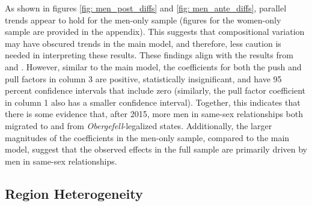 \documentclass[12pt,letterpaper]{article}
\begin{document}
As shown in figures \ref{fig: men_post_diffs} and \ref{fig: men_ante_diffs}, parallel trends appear to hold for the men-only sample (figures for the women-only sample are provided in the appendix). This suggests that compositional variation may have obscured trends in the main model, and therefore, less caution is needed in interpreting these results. These findings align with the results from \citet{1} and \citet{12}. However, similar to the main model, the coefficients for both the push and pull factors in column 3 are positive, statistically insignificant, and have 95 percent confidence intervals that include zero (similarly, the pull factor coefficient in column 1 also has a smaller confidence interval). Together, this indicates that there is some evidence that, after 2015, more men in same-sex relationships both migrated to and from \textit{Obergefell}-legalized states. Additionally, the larger magnitudes of the coefficients in the men-only sample, compared to the main model, suggest that the observed effects in the full sample are primarily driven by men in same-sex relationships.

\FloatBarrier
\subsection{Region Heterogeneity}


\end{document}
